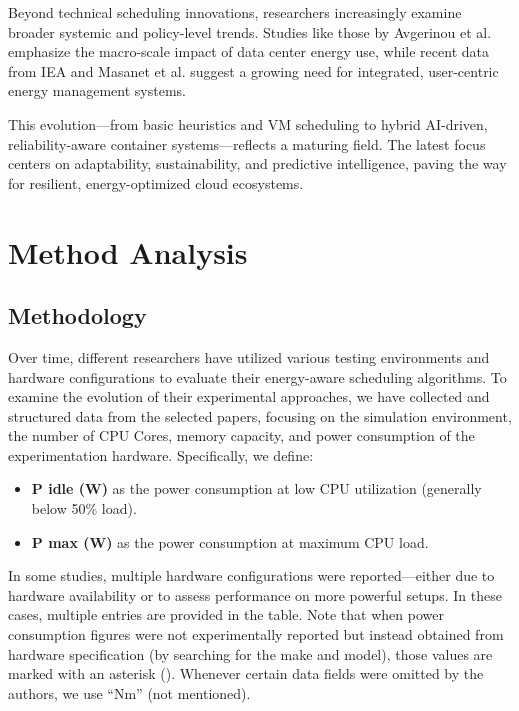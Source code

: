 \documentclass[runningheads]{llncs}
\begin{document}
Beyond technical scheduling innovations, researchers increasingly examine broader systemic and policy-level trends. Studies like those by Avgerinou et al.\cite{avgerinou_trends_2017} emphasize the macro-scale impact of data center energy use, while recent data from IEA and Masanet et al.\cite{masanet_2020, hintemann_2022, IEADataCentres} suggest a growing need for integrated, user-centric energy management systems.

This evolution—from basic heuristics and VM scheduling to hybrid AI-driven, reliability-aware container systems—reflects a maturing field. The latest focus centers on adaptability, sustainability, and predictive intelligence, paving the way for resilient, energy-optimized cloud ecosystems.

\section{Method Analysis}

\subsection{Methodology}

Over time, different researchers have utilized various testing environments and hardware configurations to evaluate their energy-aware scheduling algorithms. To examine the evolution of their experimental approaches, we have collected and structured data from the selected papers, focusing on the simulation environment, the number of CPU Cores, memory capacity, and power consumption of the experimentation hardware. Specifically, we define:

\begin{itemize}
    \footnotesize
    \item \textbf{P idle (W)} as the power consumption at low CPU utilization (generally below 50\% load).
    \item \textbf{P max (W)} as the power consumption at maximum CPU load.
\end{itemize}

In some studies, multiple hardware configurations were reported—either due to hardware availability or to assess performance on more powerful setups. In these cases, multiple entries are provided in the table. Note that when power consumption figures were not experimentally reported but instead obtained from hardware specification (by searching for the make and model), those values are marked with an asterisk (\textasteriskcentered). Whenever certain data fields were omitted by the authors, we use ``Nm'' (not mentioned).
\end{document}

